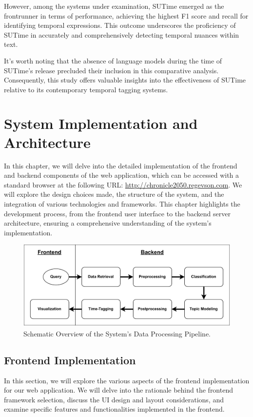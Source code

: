 \documentclass[a4paper,10pt]{report} %
\begin{document}
However, among the systems under examination, SUTime emerged as the frontrunner in terms of performance, achieving the highest F1 score and recall for identifying temporal expressions. This outcome underscores the proficiency of SUTime in accurately and comprehensively detecting temporal nuances within text.

It's worth noting that the absence of language models during the time of SUTime's release precluded their inclusion in this comparative analysis. Consequently, this study offers valuable insights into the effectiveness of SUTime relative to its contemporary temporal tagging systems. \cite{sutime}


\chapter{System Implementation and Architecture}
In this chapter, we will delve into the detailed implementation of the frontend and backend components of the web application, which can be accessed with a standard browser at the following URL: \url{http://chronicle2050.regevson.com}. We will explore the design choices made, the structure of the system, and the integration of various technologies and frameworks. This chapter highlights the development process, from the frontend user interface to the backend server architecture, ensuring a comprehensive understanding of the system's implementation.

\begin{figure}[H]
\centering
\includegraphics[width=13cm]{img/system.pdf}
\caption{Schematic Overview of the System's Data Processing Pipeline.}
\label{fig:archi}
\end{figure}


\section{Frontend Implementation}
In this section, we will explore the various aspects of the frontend implementation for our web application. We will delve into the rationale behind the frontend framework selection, discuss the UI design and layout considerations, and examine specific features and functionalities implemented in the frontend.
\end{document}
